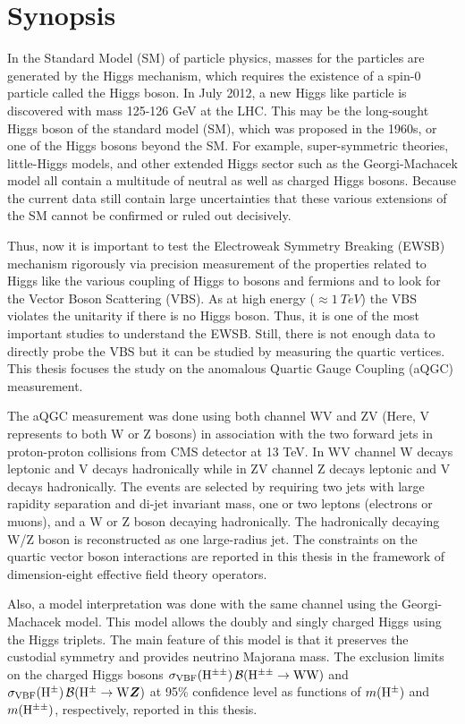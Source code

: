 \chapter*{Synopsis}
In the Standard Model (SM) of particle physics, masses for the particles are generated by the Higgs mechanism, which requires the existence of a spin-0 particle called the Higgs boson. In July 2012, a new Higgs like particle is discovered with mass 125-126 GeV at the LHC. This may be the long-sought Higgs boson of the standard model (SM), which was proposed in the 1960s, or one of the Higgs bosons beyond the SM. For example, super-symmetric theories, little-Higgs models, and other extended Higgs sector such as the Georgi-Machacek model all contain a multitude of neutral as well as charged Higgs bosons. Because the current data still contain large uncertainties that these various extensions of the SM cannot be confirmed or ruled out decisively. 

Thus, now it is important to test the Electroweak Symmetry Breaking (EWSB) mechanism rigorously via precision measurement of the properties related to Higgs like the various coupling of Higgs to bosons and fermions and to look for the Vector Boson Scattering (VBS). As at high energy ($\approx 1~TeV$) the VBS violates the unitarity if there is no Higgs boson. Thus, it is one of the most important studies to understand the EWSB. Still, there is not enough data to directly probe the VBS but it can be studied by measuring the quartic vertices. This thesis focuses the study on the anomalous Quartic Gauge Coupling (aQGC) measurement. 

The aQGC measurement was done using both channel WV and ZV (Here, V represents to both W or Z bosons) in association with the two forward jets in proton-proton collisions from CMS detector at 13 TeV. In WV channel W decays leptonic and V decays hadronically while in ZV channel Z decays leptonic and V decays hadronically. The events are selected by requiring two jets with large rapidity separation and di-jet invariant mass, one or two leptons (electrons or muons), and a W or Z boson decaying hadronically. The hadronically decaying W/Z boson is reconstructed as one large-radius jet. The constraints on the quartic vector boson interactions are reported in this thesis in the framework of dimension-eight effective field theory operators.

Also, a model interpretation was done with the same channel using the Georgi-Machacek model. This model allows the doubly and singly charged Higgs using the Higgs triplets. The main feature of this model is that it preserves the custodial symmetry and provides neutrino Majorana mass. The exclusion limits on the charged Higgs bosons $\sigma_\mathrm{VBF}(\mathrm{H^{\pm\pm}}) \, \mathcal{B}(\mathrm{H^{\pm\pm}}\to \mathrm{W}\mathrm{W})$ and $\sigma_\mathrm{VBF}(\mathrm{H}^{\pm}) \, \mathcal{B}(\mathrm{H}^{\pm}\to \mathrm{W}\boldsymbol{Z})$ at 95\% confidence level as functions of $m(\mathrm{H}^{\pm})$ and $m(\mathrm{H^{\pm\pm}})$, respectively, reported in this thesis.

